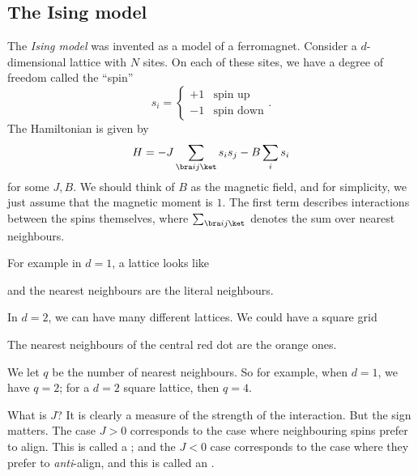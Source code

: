 \documentclass[a4paper]{article}
\begin{document}
\subsection{The Ising model}
The \emph{Ising model} was invented as a model of a ferromagnet. Consider a $d$-dimensional lattice with $N$ sites. On each of these sites, we have a degree of freedom called the ``spin''
\[
  s_i =
  \begin{cases}
    +1 & \text{spin up}\\
    -1 & \text{spin down}
  \end{cases}.
\]
The Hamiltonian is given by
\[
  H = -J \sum_{\bra i j\ket} s_i s_j - B \sum_i s_i
\]
for some $J, B$. We should think of $B$ as the magnetic field, and for simplicity, we just assume that the magnetic moment is $1$. The first term describes interactions between the spins themselves, where $\sum_{\bra i j\ket}$ denotes the sum over nearest neighbours.

For example in $d = 1$, a lattice looks like
\begin{center}
\end{center}
and the nearest neighbours are the literal neighbours.

In $d = 2$, we can have many different lattices. We could have a square grid
\begin{center}
\end{center}
The nearest neighbours of the central red dot are the orange ones.

We let $q$ be the number of nearest neighbours. So for example, when $d = 1$, we have $q = 2$; for a $d = 2$ square lattice, then $q = 4$.

What is $J$? It is clearly a measure of the strength of the interaction. But the sign matters. The case $J > 0$ corresponds to the case where neighbouring spins prefer to align. This is called a ; and the $J < 0$ case corresponds to the case where they prefer to \emph{anti}-align, and this is called an .
\end{document}
